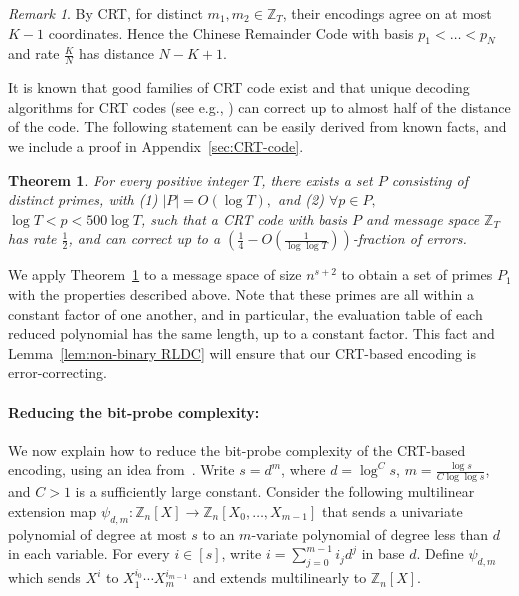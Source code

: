 \documentclass[11pt,english]{article}
\newtheorem{theorem}{Theorem}
\theoremstyle{definition}
\theoremstyle{remark}
\newtheorem*{rem}{Remark}
\newcommand{\Z}{\mathbb{Z}}
\begin{document}
\begin{rem} By CRT, for distinct $m_{1},m_{2}\in\Z_{T}$, their encodings
agree on at most $K-1$ coordinates. Hence the Chinese Remainder Code
with basis $p_{1}<\ldots<p_{N}$ and rate $\frac{K}{N}$ has distance
$N-K+1$. \end{rem}

It is known that good families of CRT code exist and that
unique decoding algorithms for CRT codes (see e.g., \cite{grs:crt-errors})
can correct up to almost half of the distance of the code. The following
statement can be easily derived from known facts, and we include a
proof in Appendix~\ref{sec:CRT-code}. 

\begin{theorem}\label{thm:CRT code}For every positive integer $T$,
there exists a set $P$ consisting of distinct primes, with (1) $|P|=O(\log T),$
and (2) $\forall p\in P,$ $\log T<p<500\log T$, such that a CRT
code with basis $P$ and message space $\Z_{T}$ has rate $\frac{1}{2}$,
and can correct up to a $(\frac{1}{4}-O(\frac{1}{\log\log T}))$-fraction of errors. 
\end{theorem}

We apply Theorem~\ref{thm:CRT code} to a message space of size $n^{s+2}$ to obtain 
a set of primes $P_{1}$ with the properties described above.
Note that these primes are all within a constant
factor of one another, and in particular, the evaluation table of
each reduced polynomial has the same length, up to a constant factor.
This fact and Lemma~\ref{lem:non-binary RLDC} will ensure that our CRT-based
encoding is error-correcting.


\paragraph{\textbf{Reducing the bit-probe complexity:}}

We now explain how to reduce the bit-probe complexity of the CRT-based
encoding, using an idea from~\cite{kedl-umans}. Write $s=d^{m}$, where
$d=\log^{C}s$, $m=\frac{\log s}{C\log\log s}$, and $C>1$ is a sufficiently
large constant. Consider the following multilinear extension map $\psi_{d,m}:\Z_{n}[X]\rightarrow\Z_{n}[X_{0},\ldots,X_{m-1}]$
that sends a univariate polynomial of degree at most $s$ to an $m$-variate
polynomial of degree less than $d$ in each variable. For every $i\in[s]$,
write $i=\sum_{j=0}^{m-1}i_{j}d^{j}$ in base $d$. Define $\psi_{d,m}$
which sends $X^{i}$ to $X_{1}^{i_{0}}\cdots X_{m}^{i_{m-1}}$ and extends
multilinearly to $\Z_{n}[X]$. 
\end{document}
